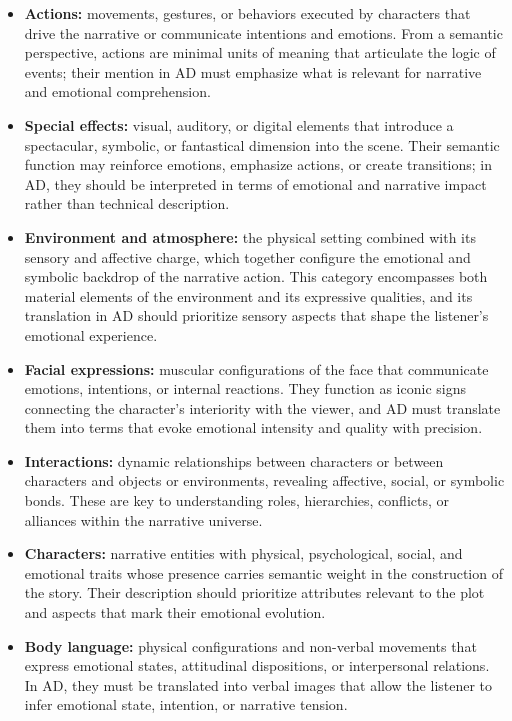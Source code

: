 \documentclass[pdflatex,iicol,sn-mathphys-num]{sn-jnl}%
\theoremstyle{thmstyleone}%
\theoremstyle{thmstyletwo}%
\theoremstyle{thmstylethree}%
\begin{document}
\begin{itemize}
    \item \textbf{Actions:} movements, gestures, or behaviors executed by characters that drive the narrative or communicate intentions and emotions. From a semantic perspective, actions are minimal units of meaning that articulate the logic of events; their mention in AD must emphasize what is relevant for narrative and emotional comprehension.

    \item \textbf{Special effects:} visual, auditory, or digital elements that introduce a spectacular, symbolic, or fantastical dimension into the scene. Their semantic function may reinforce emotions, emphasize actions, or create transitions; in AD, they should be interpreted in terms of emotional and narrative impact rather than technical description.

    \item \textbf{Environment and atmosphere:} the physical setting combined with its sensory and affective charge, which together configure the emotional and symbolic backdrop of the narrative action. This category encompasses both material elements of the environment and its expressive qualities, and its translation in AD should prioritize sensory aspects that shape the listener's emotional experience.

    \item \textbf{Facial expressions:} muscular configurations of the face that communicate emotions, intentions, or internal reactions. They function as iconic signs connecting the character's interiority with the viewer, and AD must translate them into terms that evoke emotional intensity and quality with precision.

    \item \textbf{Interactions:} dynamic relationships between characters or between characters and objects or environments, revealing affective, social, or symbolic bonds. These are key to understanding roles, hierarchies, conflicts, or alliances within the narrative universe.

    \item \textbf{Characters:} narrative entities with physical, psychological, social, and emotional traits whose presence carries semantic weight in the construction of the story. Their description should prioritize attributes relevant to the plot and aspects that mark their emotional evolution.

    \item \textbf{Body language:} physical configurations and non-verbal movements that express emotional states, attitudinal dispositions, or interpersonal relations. In AD, they must be translated into verbal images that allow the listener to infer emotional state, intention, or narrative tension.
\end{itemize}
\end{document}
